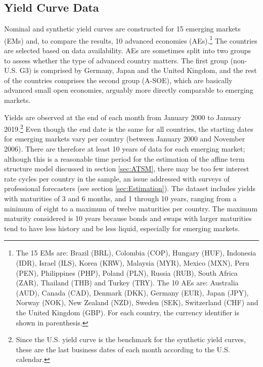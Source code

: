 {\subsection{Yield Curve Data}
\iftoggle{toclinks}{\gototoc}{} %

Nominal and synthetic yield curves are constructed for 15 emerging markets (EMs) and, to compare the results, 10 advanced economies (AEs).\footnote{ The 15 EMs are: Brazil (BRL), Colombia (COP), Hungary (HUF), Indonesia (IDR), Israel (ILS), Korea (KRW), Malaysia (MYR), Mexico (MXN), Peru (PEN), Philippines (PHP), Poland (PLN), Russia (RUB), South Africa (ZAR), Thailand (THB) and Turkey (TRY). The 10 AEs are: Australia (AUD), Canada (CAD), Denmark (DKK), Germany (EUR), Japan (JPY), Norway (NOK), New Zealand (NZD), Sweden (SEK), Switzerland (CHF) and the United Kingdom (GBP). For each country, the currency identifier is shown in parenthesis.} 
The countries are selected based on data availability. 
AEs are sometimes split into two groups to assess whether the type of advanced country matters. The first group (non-U.S. G3) is comprised by Germany, Japan and the United Kingdom, and the rest of the countries comprises the second group (A-SOE), which are basically advanced small open economies, arguably more directly comparable to emerging markets.

Yields are observed at the end of each month from January 2000 to January 2019.\footnote{ Since the U.S. yield curve is the benchmark for the synthetic yield curves, these are the last business dates of each month according to the U.S. calendar.}
Even though the end date is the same for all countries, the starting dates for emerging markets vary per country (between January 2000 and November 2006). 
There are therefore at least 10 years of data for each emerging market; although this is a reasonable time period for the estimation of the affine term structure model discussed in section \ref{sec:ATSM}, there may be too few interest rate cycles per country in the sample, an issue addressed with surveys of professional forecasters (see section \ref{sec:Estimation}). 
The dataset includes yields with maturities of 3 and 6 months, and 1 through 10 years, ranging from a minimum of eight to a maximum of twelve maturities per country. 
The maximum maturity considered is 10 years because bonds and swaps with larger maturities tend to have less history and be less liquid, especially for emerging markets.
%	

}

